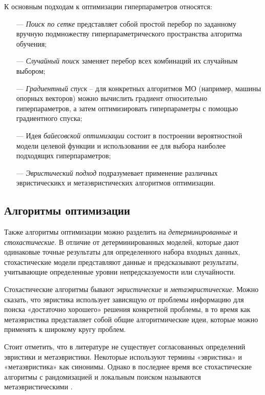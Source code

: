 К основным подходам к оптимизации гиперпараметров относятся:

\begin{itemize}
    \item[—] \emph{Поиск по сетке} представляет собой простой перебор
        по заданному вручную подмножеству гиперпараметрического пространства
        алгоритма обучения;
    \item[—] \emph{Случайный поиск} заменяет перебор всех комбинаций их случайным выбором;
    \item[—] \emph{Градиентный спуск} -- для конкретных алгоритмов МО (например, машины опорных векторов)
        можно вычислить градиент относительно гиперпараметров, а затем
        оптимизировать гиперпараметры с помощью градиентного спуска;
    \item[—] Идея \emph{байесовской оптимизации} состоит в построении
        вероятностной модели целевой функции и использовании ее для выбора
        наиболее подходящих гиперпараметров;
    \item[—] \emph{Эвристический подход} подразумевает применение различных эвристическикх и
        метаэвристических алгоритмов оптимизации.
\end{itemize}

\subsection{Алгоритмы оптимизации}

Также алгоритмы оптимизации можно разделить на \emph{детерминированные} и
\emph{стохастические}. В отличие от детерминированных моделей,
которые дают одинаковые точные результаты для определенного набора
входных данных, стохастические модели представляют данные и
предсказывают результаты, учитывающие определенные уровни
непредсказуемости или случайности.

Стохастические алгоритмы бывают \emph{эвристические} и \emph{метаэвристические}.
Можно сказать, что эвристика использует зависящую от проблемы информацию
для поиска «достаточно хорошего» решения конкретной проблемы, в
то время как метаэвристика представляет собой общие алгоритмические
идеи, которые можно применять к широкому кругу проблем.

Стоит отметить, что в литературе не существует согласованных определений
эвристики и метаэвристики. Некоторые используют термины «эвристика» и
«метаэвристика» как синонимы. Однако в последнее время все стохастические
алгоритмы с рандомизацией и локальным поиском называются
метаэвристическими \cite{Yang2009}.

